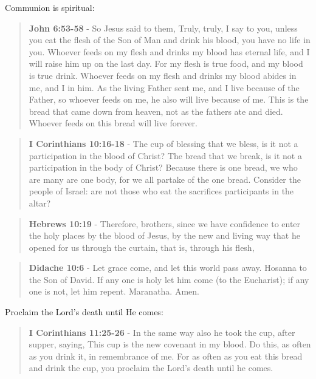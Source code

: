\documentclass[11pt]{article}
\begin{document}
Communion is spiritual:

\begin{quote}
\textbf{John 6:53-58} - So Jesus said to them, Truly, truly, I say to you, unless you eat the flesh of the Son of Man and drink his blood, you have no life in you.  Whoever feeds on my flesh and drinks my blood has eternal life, and I will raise him up on the last day.  For my flesh is true food, and my blood is true drink.  Whoever feeds on my flesh and drinks my blood abides in me, and I in him.  As the living Father sent me, and I live because of the Father, so whoever feeds on me, he also will live because of me.  This is the bread that came down from heaven, not as the fathers ate and died. Whoever feeds on this bread will live forever.
\end{quote}

\begin{quote}
\textbf{I Corinthians 10:16-18} - The cup of blessing that we bless, is it not a participation in the blood of Christ? The bread that we break, is it not a participation in the body of Christ? Because there is one bread, we who are many are one body, for we all partake of the one bread. Consider the people of Israel: are not those who eat the sacrifices participants in the altar?
\end{quote}

\begin{quote}
\textbf{Hebrews 10:19} - Therefore, brothers, since we have confidence to enter the holy places by the blood of Jesus, by the new and living way that he opened for us through the curtain, that is, through his flesh,
\end{quote}

\begin{quote}
\textbf{Didache 10:6} - Let grace come, and let this world pass away. Hosanna to the Son of David. If any one is holy let him come (to the Eucharist); if any one is not, let him repent. Maranatha. Amen.
\end{quote}

Proclaim the Lord's death until He comes:

\begin{quote}
\textbf{I Corinthians 11:25-26} - In the same way also he took the cup, after supper, saying, This cup is the new covenant in my blood. Do this, as often as you drink it, in remembrance of me. For as often as you eat this bread and drink the cup, you proclaim the Lord's death until he comes.
\end{quote}
\end{document}
